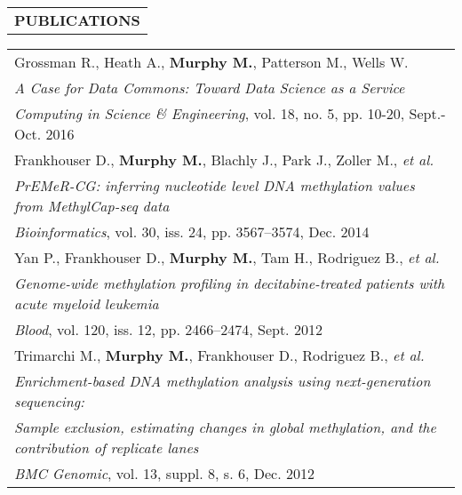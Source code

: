 \begin{tabularx}{\textwidth}{ L }
  \textbf{PUBLICATIONS} \\
\end{tabularx}

\begin{tabularx}{\textwidth}{ X }
    Grossman R., Heath A., \textbf{Murphy M.}, Patterson M., Wells W. \\
    \footnotesize\textit{A Case for Data Commons: Toward Data Science as a Service} \\
    \footnotesize{\textit{Computing in Science \& Engineering}, vol. 18, no. 5, pp. 10-20, Sept.-Oct. 2016} \\

    \vspace{1pt}

    Frankhouser D., \textbf{Murphy M.}, Blachly J., Park J., Zoller M., \textit{et al.} \\
    \footnotesize\textit{PrEMeR-CG: inferring nucleotide level DNA methylation values from MethylCap-seq data} \\
    \footnotesize{\textit{Bioinformatics}, vol. 30, iss. 24, pp. 3567--3574, Dec. 2014} \\

    \vspace{1pt}

    Yan P., Frankhouser D., \textbf{Murphy M.}, Tam H., Rodriguez B., \textit{et al.} \\
    \footnotesize\textit{Genome-wide methylation profiling in decitabine-treated patients with acute myeloid leukemia} \\
    \footnotesize{\textit{Blood}, vol. 120, iss. 12, pp. 2466--2474, Sept. 2012} \\

    \vspace{1pt}

    Trimarchi M., \textbf{Murphy M.}, Frankhouser D., Rodriguez B., \textit{et al.} \\
    \footnotesize\textit{Enrichment-based DNA methylation analysis using next-generation sequencing:} \\
    \footnotesize\textit{Sample exclusion, estimating changes in global methylation, and the contribution of replicate lanes} \\
    \footnotesize{\textit{BMC Genomic}, vol. 13, suppl. 8, s. 6, Dec. 2012} \\

%
\end{tabularx}

